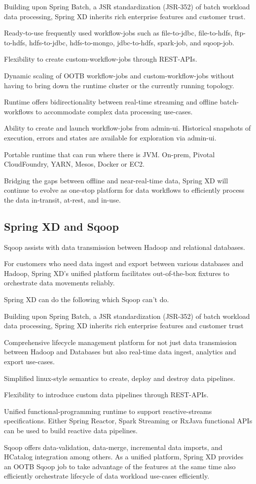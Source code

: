 \begin{itemize*}
\item Building upon Spring Batch, a JSR standardization (JSR-352) of batch workload data processing, Spring XD inherits rich enterprise features and customer trust.
\item Ready-to-use frequently used workflow-jobs such as file-to-jdbc, file-to-hdfs, ftp-to-hdfs, hdfs-to-jdbc, hdfs-to-mongo, jdbc-to-hdfs, spark-job, and sqoop-job.
\item Flexibility to create custom-workflow-jobs through REST-APIs.
\item Dynamic scaling of OOTB workflow-jobs and custom-workflow-jobs without having to bring down the runtime cluster or the currently running topology.
\item Runtime offers bidirectionality between real-time streaming and offline batch-workflows to accommodate complex data processing use-cases.
\item Ability to create and launch workflow-jobs from admin-ui. Historical snapshots of execution, errors and states are available for exploration via admin-ui.
\item Portable runtime that can run where there is JVM. On-prem, Pivotal CloudFoundry, YARN, Mesos, Docker or EC2.
\end{itemize*}

Bridging the gaps between offline and near-real-time data, Spring XD will continue to evolve as one-stop platform for data workflows to efficiently process the data in-transit, at-rest, and in-use.

\subsection{Spring XD and Sqoop}
Sqoop assists with data transmission between Hadoop and relational databases.

For customers who need data ingest and export between various databases and Hadoop, Spring XD's unified platform facilitates out-of-the-box fixtures to orchestrate data movements reliably. 

Spring XD can do the following which Sqoop can't do.

\begin{itemize*}
\item Building upon Spring Batch, a JSR standardization (JSR-352) of batch workload data processing, Spring XD inherits rich enterprise features and customer trust
\item Comprehensive lifecycle management platform for not just data transmission between Hadoop and Databases but also real-time data ingest, analytics and export use-cases.
\item Simplified linux-style semantics to create, deploy and destroy data pipelines.
\item Flexibility to introduce custom data pipelines through REST-APIs.
\item Unified functional-programming runtime to support reactive-streams specifications. Either Spring Reactor, Spark Streaming or RxJava functional APIs can be used to build reactive data pipelines.
\end{itemize*}

Sqoop offers data-validation, data-merge, incremental data imports, and HCatalog integration among others. As a unified platform, Spring XD provides an OOTB Sqoop job to take advantage of the features at the same time also efficiently orchestrate lifecycle of data workload use-cases efficiently.
